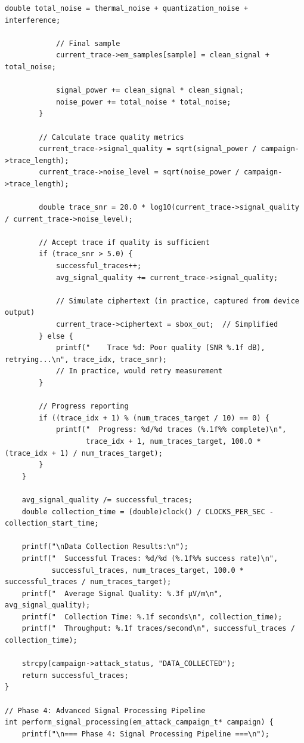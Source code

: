 \documentclass[11pt,a4paper]{article}
\theoremstyle{definition}
\begin{document}
\begin{lstlisting}[caption={Complete EM Attack Methodology Framework Implementation}]
            double total_noise = thermal_noise + quantization_noise + interference;
            
            // Final sample
            current_trace->em_samples[sample] = clean_signal + total_noise;
            
            signal_power += clean_signal * clean_signal;
            noise_power += total_noise * total_noise;
        }
        
        // Calculate trace quality metrics
        current_trace->signal_quality = sqrt(signal_power / campaign->trace_length);
        current_trace->noise_level = sqrt(noise_power / campaign->trace_length);
        
        double trace_snr = 20.0 * log10(current_trace->signal_quality / current_trace->noise_level);
        
        // Accept trace if quality is sufficient
        if (trace_snr > 5.0) {
            successful_traces++;
            avg_signal_quality += current_trace->signal_quality;
            
            // Simulate ciphertext (in practice, captured from device output)
            current_trace->ciphertext = sbox_out;  // Simplified
        } else {
            printf("    Trace %d: Poor quality (SNR %.1f dB), retrying...\n", trace_idx, trace_snr);
            // In practice, would retry measurement
        }
        
        // Progress reporting
        if ((trace_idx + 1) % (num_traces_target / 10) == 0) {
            printf("  Progress: %d/%d traces (%.1f%% complete)\n", 
                   trace_idx + 1, num_traces_target, 100.0 * (trace_idx + 1) / num_traces_target);
        }
    }
    
    avg_signal_quality /= successful_traces;
    double collection_time = (double)clock() / CLOCKS_PER_SEC - collection_start_time;
    
    printf("\nData Collection Results:\n");
    printf("  Successful Traces: %d/%d (%.1f%% success rate)\n", 
           successful_traces, num_traces_target, 100.0 * successful_traces / num_traces_target);
    printf("  Average Signal Quality: %.3f μV/m\n", avg_signal_quality);
    printf("  Collection Time: %.1f seconds\n", collection_time);
    printf("  Throughput: %.1f traces/second\n", successful_traces / collection_time);
    
    strcpy(campaign->attack_status, "DATA_COLLECTED");
    return successful_traces;
}

// Phase 4: Advanced Signal Processing Pipeline
int perform_signal_processing(em_attack_campaign_t* campaign) {
    printf("\n=== Phase 4: Signal Processing Pipeline ===\n");
    

\end{lstlisting}
\end{document}
